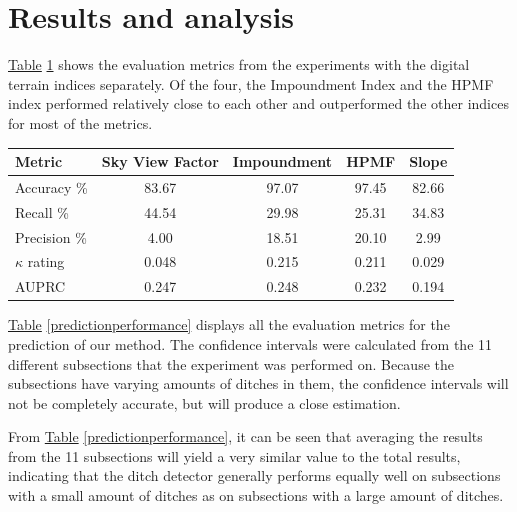 \documentclass[]{interact}
\theoremstyle{plain}%
\theoremstyle{definition}
\theoremstyle{remark}
\begin{document}
\section{Results and analysis}

\hyperref[recreatedpredictionperformance]{Table} \ref{recreatedpredictionperformance} shows the evaluation metrics from the experiments with the digital terrain indices separately. Of the four, the Impoundment Index and the HPMF index performed relatively close to each other and outperformed the other indices for most of the metrics.

\begin{table}[!htb]
    {\begin{tabular}{lcccc} \toprule
        Metric & Sky View Factor & Impoundment & HPMF & Slope\\ \midrule
        Accuracy \%     & 83.67 & 97.07 & 97.45 & 82.66 \\
        Recall \%       & 44.54 & 29.98 & 25.31 & 34.83 \\
        Precision \%    &{ 4.00}  & 18.51 & 20.10 & { 2.99} \\
        $\kappa$ rating & 0.048 & 0.215 & 0.211 & 0.029 \\
        AUPRC & 0.247 & 0.248 & 0.232 & 0.194 \\ \bottomrule
    \end{tabular}}
    \label{recreatedpredictionperformance}
\end{table}

\hyperref[predictionperformance]{Table} \ref{predictionperformance} displays all the evaluation metrics for the prediction of our method. The confidence intervals were calculated from the 11 different subsections that the experiment was performed on. Because the subsections have varying amounts of ditches in them, the confidence intervals will not be completely accurate, but will produce a close estimation.

From \hyperref[predictionperformance]{Table} \ref{predictionperformance}, it can be seen that averaging the results from the 11 subsections will yield a very similar value to the total results, indicating that the ditch detector generally performs equally well on subsections with a small amount of ditches as on subsections with a large amount of ditches.
\end{document}
